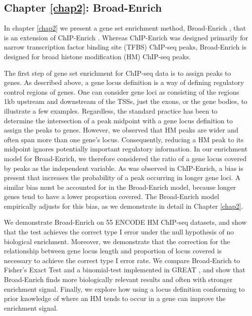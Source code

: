 \subsection{Chapter \ref{chap2}: Broad-Enrich}
\label{intro:broad}

In chapter \ref{chap2} we present a gene set enrichment method, Broad-Enrich \cite{Cavalcante:2014dr}, that is an extension of ChIP-Enrich \cite{Welch:2014fb}. Whereas ChIP-Enrich was designed primarily for narrow transcription factor binding site (TFBS) ChIP-seq peaks, Broad-Enrich is designed for broad histone modification (HM) ChIP-seq peaks.

The first step of gene set enrichment for ChIP-seq data is to assign peaks to genes. As described above, a gene locus definition is a way of defining regulatory control regions of genes. One can consider gene loci as consisting of the regions 1kb upstream and downstream of the TSSs, just the exons, or the gene bodies, to illustrate a few examples. Regardless, the standard practice has been to determine the intersection of a peak midpoint with a gene locus definition to assign the peaks to genes. However, we observed that HM peaks are wider and often span more than one gene's locus. Consequently, reducing a HM peak to its midpoint ignores potentially important regulatory information. In our enrichment model for Broad-Enrich, we therefore considered the ratio of a gene locus covered by peaks as the independent variable. As was observed in ChIP-Enrich, a bias is present that increases the probability of a peak occurring in longer gene loci. A similar bias must be accounted for in the Broad-Enrich model, because longer genes tend to have a lower proportion covered. The Broad-Enrich model empirically adjusts for this bias, as we demonstrate in detail in Chapter \ref{chap2}.

We demonstrate Broad-Enrich on 55 ENCODE HM ChIP-seq datasets, and show that the test achieves the correct type I error under the null hypothesis of no biological enrichment. Moreover, we demonstrate that the correction for the relationship between gene locus length and proportion of locus covered is necessary to achieve the correct type I error rate. We compare Broad-Enrich to Fisher's Exact Test and a binomial-test implemented in GREAT \cite{McLean:2010iq}, and show that Broad-Enrich finds more biologically relevant results and often with stronger enrichment signal. Finally, we explore how using a locus definition conforming to prior knowledge of where an HM tends to occur in a gene can improve the enrichment signal.

